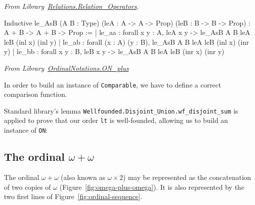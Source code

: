 \vspace{4pt}
\noindent
\emph{From Library~\href{https://coq.inria.fr/distrib/current/stdlib/Coq.Relations.Relation_Operators.html}{Relations.Relation\_Operators}}.

\begin{Coqanswer}
Inductive
le_AsB (A B : Type) (leA : A -> A -> Prop) (leB : B -> B -> Prop)
  : A + B -> A + B -> Prop :=
| le_aa : forall x y : A, leA x y -> le_AsB A B leA leB (inl x) (inl y)
| le_ab : forall (x : A) (y : B), le_AsB A B leA leB (inl x) (inr y)
| le_bb : forall x y : B, leB x y -> le_AsB A B leA leB (inr x) (inr y)
\end{Coqanswer}


\vspace{4pt}
\noindent\emph{From Library~\href{../theories/html/hydras.OrdinalNotations.ON_plus.html}{OrdinalNotations.ON\_plus}}




In order to build an instance of \texttt{Comparable}, we have to define a correct comparison function.



Standard library's lemma \texttt{Wellfounded.Disjoint\_Union.wf\_disjoint\_sum} 
is applied  to prove that our order \texttt{lt} is well-founded, allowing us to build an instance of \texttt{ON}:


\subsection{The ordinal \texorpdfstring{$\omega+\omega$}{omega + omega}}

The ordinal $\omega+\omega$ (also known as $\omega\times 2$) may be represented as the concatenation 
of two copies of $\omega$ (Figure~\ref{fig:omega-plus-omega}).
It is also represented by the two first lines of Figure~\ref{fig:ordinal-sequence}.

